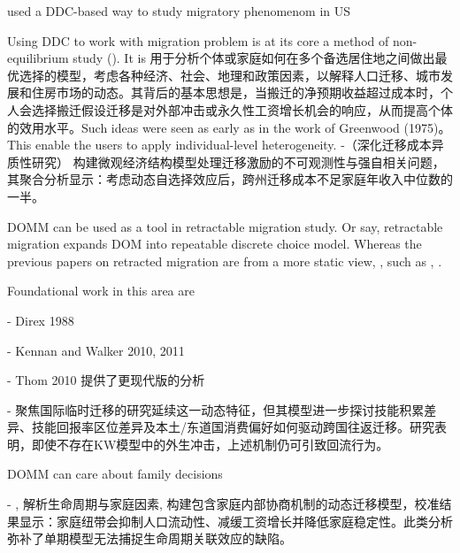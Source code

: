 \documentclass[a4paper,12pt,oneside]{book} %
\begin{document}
\cite{kennanEffectExpectedIncome2011} used a DDC-based way to study migratory phenomenom in US

Using DDC to work with migration problem is at its core a method of non-equilibrium study (\cite{jiaEconomicsInternalMigration2023}). 
It is 用于分析个体或家庭如何在多个备选居住地之间做出最优选择的模型，考虑各种经济、社会、地理和政策因素，以解释人口迁移、城市发展和住房市场的动态。其背后的基本思想是，当搬迁的净预期收益超过成本时，个人会选择搬迁假设迁移是对外部冲击或永久性工资增长机会的响应，从而提高个体的效用水平。Such ideas were seen as early as in the work of Greenwood (1975)。This enable the users to apply individual-level heterogeneity.
-（深化迁移成本异质性研究）
\cite{bayerDynamicsInterstateMigration2012}构建微观经济结构模型处理迁移激励的不可观测性与强自相关问题，其聚合分析显示：考虑动态自选择效应后，跨州迁移成本不足家庭年收入中位数的一半。



DOMM can be used as a tool in retractable migration study. Or say, retractable migration expands DOM into repeatable discrete choice model. Whereas the previous papers on retracted migration are from a more static view, , such as \cite{RenYuanNongCunWaiChuLaoDongLiHuiLiuQianYiDeYingXiangYinSuHeHuiLiuXiaoYing2017}, \cite{ShiZhiLeiJiaTingBingFuJiaTingJueCeYuNongCunQianYiLaoDongLiHuiLiu2012}.

Foundational work in this area are

- Direx 1988

- Kennan and Walker 2010, 2011

- Thom 2010 提供了更现代版的分析

- \cite{dustmannEconomicsTemporaryMigrations2016}聚焦国际临时迁移的研究延续这一动态特征，但其模型进一步探讨技能积累差异、技能回报率区位差异及本土/东道国消费偏好如何驱动跨国往返迁移。研究表明，即使不存在KW模型中的外生冲击，上述机制仍可引致回流行为。









DOMM can care about family decisions

- \cite{gemiciFamilyMigrationLabor2007}, 解析生命周期与家庭因素, 构建包含家庭内部协商机制的动态迁移模型，校准结果显示：家庭纽带会抑制人口流动性、减缓工资增长并降低家庭稳定性。此类分析弥补了单期模型无法捕捉生命周期关联效应的缺陷。
\end{document}

